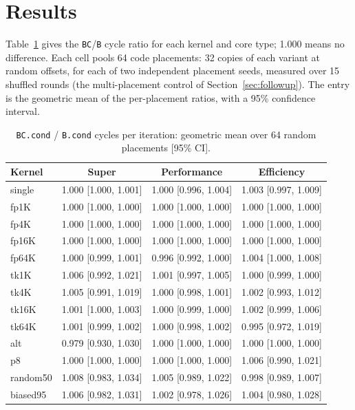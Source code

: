 \documentclass[10pt]{article}
\begin{document}
\section{Results}
Table~\ref{tab:main} gives the \texttt{BC}/\texttt{B} cycle ratio for each kernel and core
type; 1.000 means no difference. Each cell pools 64 code placements: 32 copies of each
variant at random offsets, for each of two independent placement seeds, measured over
15 shuffled rounds (the multi-placement control of Section~\ref{sec:followup}). The
entry is the geometric mean of the per-placement ratios, with a 95\% confidence interval.

\begin{table}[h]
\centering
\small
\caption{\texttt{BC.cond} / \texttt{B.cond} cycles per iteration: geometric mean over 64
random placements [95\% CI].}
\label{tab:main}
\begin{tabular}{lccc}
\toprule
Kernel & Super & Performance & Efficiency \\
\midrule
single    & 1.000 [1.000, 1.001] & 1.000 [0.996, 1.004] & 1.003 [0.997, 1.009] \\
fp1K      & 1.000 [1.000, 1.000] & 1.000 [1.000, 1.000] & 1.000 [1.000, 1.000] \\
fp4K      & 1.000 [1.000, 1.000] & 1.000 [1.000, 1.000] & 1.000 [1.000, 1.000] \\
fp16K     & 1.000 [1.000, 1.000] & 1.000 [1.000, 1.000] & 1.000 [1.000, 1.000] \\
fp64K     & 1.000 [0.999, 1.001] & 0.996 [0.992, 1.000] & 1.004 [1.000, 1.008] \\
tk1K      & 1.006 [0.992, 1.021] & 1.001 [0.997, 1.005] & 1.000 [0.999, 1.000] \\
tk4K      & 1.005 [0.991, 1.019] & 1.000 [0.998, 1.001] & 1.002 [0.993, 1.012] \\
tk16K     & 1.001 [1.000, 1.003] & 1.000 [0.999, 1.000] & 1.002 [0.999, 1.006] \\
tk64K     & 1.001 [0.999, 1.002] & 1.000 [0.998, 1.002] & 0.995 [0.972, 1.019] \\
alt       & 0.979 [0.930, 1.030] & 1.000 [1.000, 1.000] & 1.000 [1.000, 1.000] \\
p8        & 1.000 [1.000, 1.000] & 1.000 [1.000, 1.000] & 1.006 [0.990, 1.021] \\
random50  & 1.008 [0.983, 1.034] & 1.005 [0.989, 1.022] & 0.998 [0.989, 1.007] \\
biased95  & 1.006 [0.982, 1.031] & 1.002 [0.978, 1.026] & 1.004 [0.980, 1.028] \\
\bottomrule
\end{tabular}
\end{table}
\end{document}
